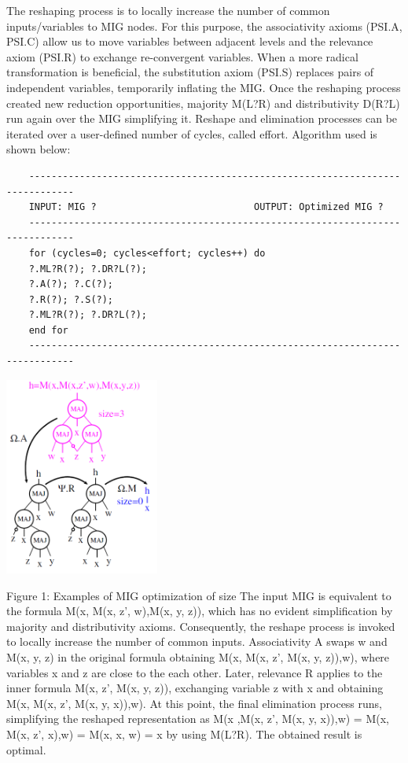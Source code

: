 \documentclass[
	accentcolor=1c,%
	type=intern,
	marginpar=false,
	ruledheaders=section,
	class=report,
	BCOR=5mm,
      parskip=half-,
	fontsize=10pt
	]{tudapub}
\begin{document}
	The reshaping process is to locally increase the number of common inputs/variables to MIG nodes. For this purpose, the associativity axioms (PSI.A, PSI.C) allow us to move variables between adjacent levels and the relevance axiom (PSI.R) to exchange re-convergent variables. When a more radical transformation is beneficial, the substitution axiom (PSI.S) replaces pairs of independent variables, temporarily inflating the MIG. Once the reshaping process created new reduction opportunities, majority M(L?R) and distributivity D(R?L) run again over the MIG simplifying it. Reshape and elimination processes can be iterated over a user-defined number of cycles, called effort.
	Algorithm used is shown below:\newline
	\begin{verbatim}
	------------------------------------------------------------------------------
	INPUT: MIG ? 							OUTPUT: Optimized MIG ?
	------------------------------------------------------------------------------
	for (cycles=0; cycles<effort; cycles++) do
	?.ML?R(?); ?.DR?L(?);
	?.A(?); ?.C(?);
	?.R(?); ?.S(?);
	?.ML?R(?); ?.DR?L(?);
	end for
	------------------------------------------------------------------------------
	\end{verbatim}

	\begin{center}
		\includegraphics [width=2in]{example_size.png}
	\end{center}
	\centering Figure 1: Examples of MIG optimization of size
	The input MIG is equivalent to the formula M(x, M(x, z', w),M(x, y, z)), which has no evident simplification by majority and distributivity axioms. Consequently, the reshape process is invoked to locally increase the number of common inputs. Associativity A swaps w and M(x, y, z) in the original formula obtaining M(x, M(x, z', M(x, y, z)),w), where variables x and z are close to the each other. Later, relevance R applies to the inner formula M(x, z', M(x, y, z)), exchanging variable z with x and obtaining M(x, M(x, z', M(x, y, x)),w). At this point, the final elimination process runs, simplifying the reshaped representation as M(x ,M(x, z', M(x, y, x)),w) = M(x, M(x, z', x),w) = M(x, x, w) = x by using M(L?R). The obtained result is optimal.
\end{document}
